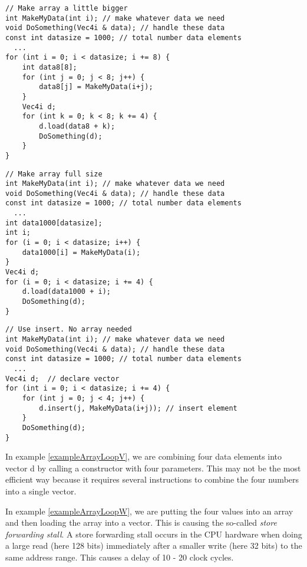 \documentclass[vcl_manual.tex]{subfiles}
\begin{document}
\begin{example}
\label{exampleArrayLoopX}
\end{example}
\begin{lstlisting}[frame=single]
// Make array a little bigger
int MakeMyData(int i); // make whatever data we need
void DoSomething(Vec4i & data); // handle these data
const int datasize = 1000; // total number data elements
  ...
for (int i = 0; i < datasize; i += 8) {
    int data8[8];
    for (int j = 0; j < 8; j++) {
        data8[j] = MakeMyData(i+j); 
    }
    Vec4i d;
    for (int k = 0; k < 8; k += 4) {
        d.load(data8 + k);
        DoSomething(d);
    }
}
\end{lstlisting}


\begin{example}
\label{exampleArrayLoopY}
\end{example}
\begin{lstlisting}[frame=single]
// Make array full size
int MakeMyData(int i); // make whatever data we need
void DoSomething(Vec4i & data); // handle these data
const int datasize = 1000; // total number data elements
  ...
int data1000[datasize];
int i;
for (i = 0; i < datasize; i++) {
    data1000[i] = MakeMyData(i); 
}
Vec4i d;
for (i = 0; i < datasize; i += 4) {
    d.load(data1000 + i);
    DoSomething(d);
}
\end{lstlisting}

\begin{example}
\label{exampleArrayLoopInsert}
\end{example}
\begin{lstlisting}[frame=single]
// Use insert. No array needed
int MakeMyData(int i); // make whatever data we need
void DoSomething(Vec4i & data); // handle these data
const int datasize = 1000; // total number data elements
  ...
Vec4i d;  // declare vector
for (int i = 0; i < datasize; i += 4) {
    for (int j = 0; j < 4; j++) {
        d.insert(j, MakeMyData(i+j)); // insert element
    }
    DoSomething(d);
}
\end{lstlisting}

In example \ref{exampleArrayLoopV}, we are combining four data elements into vector d by calling a constructor with four parameters. This may not be the most efficient way because it requires several instructions to combine the four numbers into a single vector.

In example \ref{exampleArrayLoopW}, we are putting the four values into an array and then loading the array into a vector. This is causing the so-called \emph{store forwarding stall}. A store forwarding stall occurs in the CPU hardware when doing a large read (here 128 bits) immediately after a smaller write (here 32 bits) to the same address range. This causes a delay of 10 - 20 clock cycles.
\end{document}
